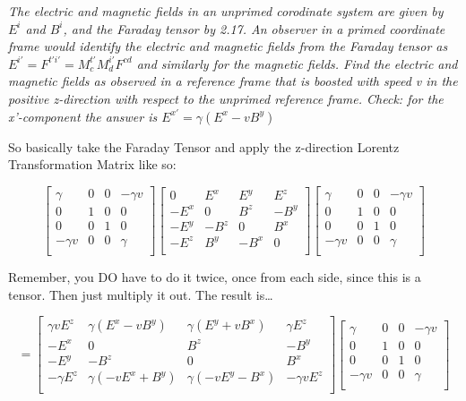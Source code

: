 \documentclass[landscape,letterpaper,10pt,english]{article}
\begin{document}
\emph{The electric and magnetic fields in an unprimed corodinate system
are given by \(E^i\) and \(B^i\), and the Faraday tensor by 2.17. An
observer in a primed coordinate frame would identify the electric and
magnetic fields from the Faraday tensor as
\(E^{i'}= F^{t'i'} = M^{t'}_c M^{i'}_{d} F^{cd}\) and similarly for the
magnetic fields. Find the electric and magnetic fields as observed in a
reference frame that is boosted with speed v in the positive z-direction
with respect to the unprimed reference frame. Check: for the
x'-component the answer is \(E^{x'} = \gamma(E^x - vB^y)\)}

    So basically take the Faraday Tensor and apply the z-direction Lorentz
Transformation Matrix like so:

\[ \begin{bmatrix}
\gamma & 0 & 0 & -\gamma v \\
0 & 1 & 0 & 0 \\
0 & 0 & 1 & 0 \\
-\gamma v & 0 & 0 & \gamma \\
\end{bmatrix}  \begin{bmatrix}
0 & E^x & E^y & E^z \\
-E^x & 0 & B^z & -B^y \\
-E^y & -B^z & 0 & B^x \\
-E^z & B^y & -B^x & 0 \\
\end{bmatrix}\begin{bmatrix}
\gamma & 0 & 0 & -\gamma v \\
0 & 1 & 0 & 0 \\
0 & 0 & 1 & 0 \\
-\gamma v & 0 & 0 & \gamma \\
\end{bmatrix}
\]

Remember, you DO have to do it twice, once from each side, since this is
a tensor. Then just multiply it out. The result is\ldots{}

    \[ = \begin{bmatrix}
\gamma v E^z & \gamma (E^x - vB^y) & \gamma(E^y + vB^x) & \gamma E^z \\
-E^x & 0 & B^z & -B^y \\
-E^y & -B^z & 0 & B^x \\
-\gamma E^z & \gamma(-vE^x + B^y) & \gamma(-vE^y - B^x) & -\gamma v E^z \\
\end{bmatrix} \begin{bmatrix}
\gamma & 0 & 0 & -\gamma v \\
0 & 1 & 0 & 0 \\
0 & 0 & 1 & 0 \\
-\gamma v & 0 & 0 & \gamma \\
\end{bmatrix}\]
\end{document}
